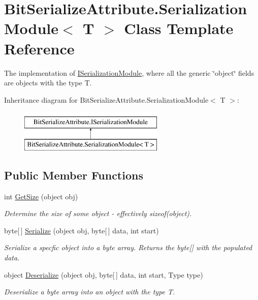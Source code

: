 \hypertarget{class_bit_serialize_attribute_1_1_serialization_module_3_01_t_01_4}{\section{Bit\-Serialize\-Attribute.\-Serialization\-Module$<$ T $>$ Class Template Reference}
\label{class_bit_serialize_attribute_1_1_serialization_module_3_01_t_01_4}
}


The implementation of \hyperlink{interface_bit_serialize_attribute_1_1_i_serialization_module}{I\-Serialization\-Module}, where all the generic \char`\"{}object\char`\"{} fields are objects with the type T.  


Inheritance diagram for Bit\-Serialize\-Attribute.\-Serialization\-Module$<$ T $>$\-:\begin{figure}[H]
\begin{center}
\leavevmode
\includegraphics[height=2.000000cm]{class_bit_serialize_attribute_1_1_serialization_module_3_01_t_01_4}
\end{center}
\end{figure}
\subsection*{Public Member Functions}
\begin{DoxyCompactItemize}
\item 
int \hyperlink{class_bit_serialize_attribute_1_1_serialization_module_3_01_t_01_4_a2ab6b7e0f1e8eccfe929221a4c86c0b3}{Get\-Size} (object obj)
\begin{DoxyCompactList}\small\item\em Determine the size of some object -\/ effectively sizeof(object). \end{DoxyCompactList}\item 
byte\mbox{[}$\,$\mbox{]} \hyperlink{class_bit_serialize_attribute_1_1_serialization_module_3_01_t_01_4_a566f48c068bafbe25a9d3371afb83892}{Serialize} (object obj, byte\mbox{[}$\,$\mbox{]} data, int start)
\begin{DoxyCompactList}\small\item\em Serialize a specfic object into a byte array. Returns the byte\mbox{[}\mbox{]} with the populated data. \end{DoxyCompactList}\item 
object \hyperlink{class_bit_serialize_attribute_1_1_serialization_module_3_01_t_01_4_a7259a654093fa61bab6ef3766d13a12e}{Deserialize} (object obj, byte\mbox{[}$\,$\mbox{]} data, int start, Type type)
\begin{DoxyCompactList}\small\item\em Deserialize a byte array into an object with the type T. \end{DoxyCompactList}\end{DoxyCompactItemize}
